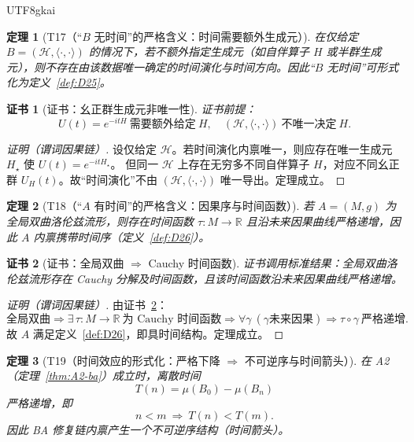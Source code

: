 \documentclass[12pt]{article}
\newtheorem{theorem}{定理}[section]
\newtheorem{Certificate}{证书}[section]
\begin{document}
\begin{CJK*}{UTF8}{gkai}
\begin{theorem}[T17（“$B$ 无时间”的严格含义：时间需要额外生成元）]
\label{thm:T17}
在仅给定 $B=(\mathcal H,\langle\cdot,\cdot\rangle)$ 的情况下，若不额外指定生成元（如自伴算子 $H$ 或半群生成元），则不存在由该数据唯一确定的时间演化与时间方向。因此“$B$
  无时间”可形式化为定义~\ref{def:D25}。
\end{theorem}

\begin{Certificate}[证书：幺正群生成元非唯一性]
\label{cert:T17}
证书前提：
\[
U(t)=e^{-itH}\ \text{需要额外给定}\ H,\quad
(\mathcal H,\langle\cdot,\cdot\rangle)\ \text{不唯一决定}\ H.
\]
\end{Certificate}

\begin{proof}[证明（谓词因果链）]
设仅给定 $\mathcal H$。若时间演化内禀唯一，则应存在唯一生成元 $H_\star$ 使 $U(t)=e^{-itH_\star}$。
但同一 $\mathcal H$ 上存在无穷多不同自伴算子 $H$，对应不同幺正群 $U_H(t)$。故“时间演化”不由 $(\mathcal H,\langle\cdot,\cdot\rangle)$ 唯一导出。定理成立。
\end{proof}

\begin{theorem}[T18（“$A$ 有时间”的严格含义：因果序与时间函数）]
\label{thm:T18}
若 $A=(M,g)$ 为全局双曲洛伦兹流形，则存在时间函数 $\tau:M\to\mathbb R$ 且沿未来因果曲线严格递增，因此 $A$ 内禀携带时间序（定义~\ref{def:D26}）。
\end{theorem}

\begin{Certificate}[证书：全局双曲 $\Rightarrow$ Cauchy 时间函数]
\label{cert:T18}
证书调用标准结果：全局双曲洛伦兹流形存在 Cauchy 分解及时间函数，且该时间函数沿未来因果曲线严格递增。
\end{Certificate}

\begin{proof}[证明（谓词因果链）]
由证书~\ref{cert:T18}：
\[
\text{全局双曲}
\Rightarrow
\exists\,\tau:M\to\mathbb R\ \text{为 Cauchy 时间函数}
\Rightarrow
\forall\gamma\ (\gamma\text{未来因果})\Rightarrow \tau\circ\gamma\ \text{严格递增}.
\]
故 $A$ 满足定义~\ref{def:D26}，即具时间结构。定理成立。
\end{proof}

\begin{theorem}[T19（时间效应的形式化：严格下降 $\Rightarrow$ 不可逆序与时间箭头）]
\label{thm:T19}
在 A2（定理~\ref{thm:A2-ba}）成立时，离散时间
\[
T(n)=\mu(B_0)-\mu(B_n)
\]
严格递增，即
\[
n<m\ \Rightarrow\ T(n)<T(m).
\]
因此 BA 修复链内禀产生一个不可逆序结构（时间箭头）。
\end{theorem}


\end{CJK*}
\end{document}
